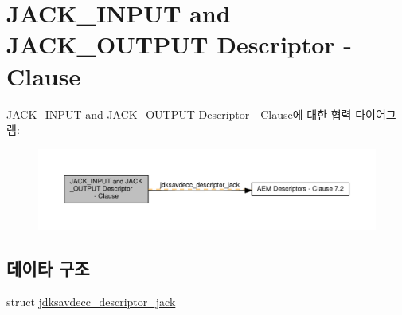 \hypertarget{group__descriptor__jack}{}\section{J\+A\+C\+K\+\_\+\+I\+N\+P\+UT and J\+A\+C\+K\+\_\+\+O\+U\+T\+P\+UT Descriptor -\/ Clause}
\label{group__descriptor__jack}
J\+A\+C\+K\+\_\+\+I\+N\+P\+UT and J\+A\+C\+K\+\_\+\+O\+U\+T\+P\+UT Descriptor -\/ Clause에 대한 협력 다이어그램\+:
\nopagebreak
\begin{figure}[H]
\begin{center}
\leavevmode
\includegraphics[width=350pt]{group__descriptor__jack}
\end{center}
\end{figure}
\subsection*{데이타 구조}
\begin{DoxyCompactItemize}
\item 
struct \hyperlink{structjdksavdecc__descriptor__jack}{jdksavdecc\+\_\+descriptor\+\_\+jack}
\end{DoxyCompactItemize}
